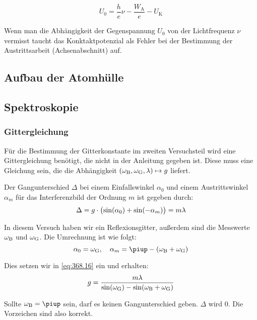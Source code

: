 \begin{equation}
    U_0 = \frac he\nu - \frac{W_\text{A}}e - U_\text{K}
    \label{eq:Energiebilanz}
\end{equation}

Wenn man die Abhängigkeit der Gegenspannung $U_0$ von der Lichtfrequenz $\nu$
vermisst taucht das Konktaktpotenzial als Fehler bei der Bestimmung der
Austrittsarbeit (Achsenabschnitt) auf.

\subsection{Aufbau der Atomhülle}

\subsection{Spektroskopie}

\subsubsection{Gittergleichung}

Für die Bestimmung der Gitterkonstante im zweiten Versuchsteil wird eine
Gittergleichung benötigt, die nicht in der Anleitung gegeben ist. Diese muss
eine Gleichung sein, die die Abhängigkeit $(\omega_\text B, \omega_\text G,
\lambda) \mapsto g$ liefert.

Der Gangunterschied $\Delta$ bei einem Einfallswinkel $\alpha_0$ und einem
Austrittswinkel $\alpha_m$ für das Interferenzbild der Ordnung $m$ ist gegeben
durch: \cite[Formel~368.16]{physik312-Anleitung}
\begin{equation}
    \label{eq:368.16}
    \Delta = g \cdot \del{\sin(\alpha_0) + \sin(-\alpha_m)} = m \lambda
\end{equation}

In diesem Versuch haben wir ein Reflexionsgitter, außerdem sind die Messwerte
$\omega_\text B$ und $\omega_\text G$. Die Umrechnung ist wie folgt:
\[
    \alpha_0 = \omega_\text G
    \eqnsep
    \alpha_m = \piup - \del{ \omega_\text B + \omega_\text G }
\]

Dies setzen wir in \eqref{eq:368.16} ein und erhalten:
\begin{equation}
    \label{eq:gittergleichung}
    g = \frac{m \lambda}{\sin(\omega_\text G) - \sin(\omega_\text B + \omega_\text G)}
\end{equation}

Sollte $\omega_\text B = \piup$ sein, darf es keinen Gangunterschied geben.
$\Delta$ wird 0. Die Vorzeichen sind also korrekt.

